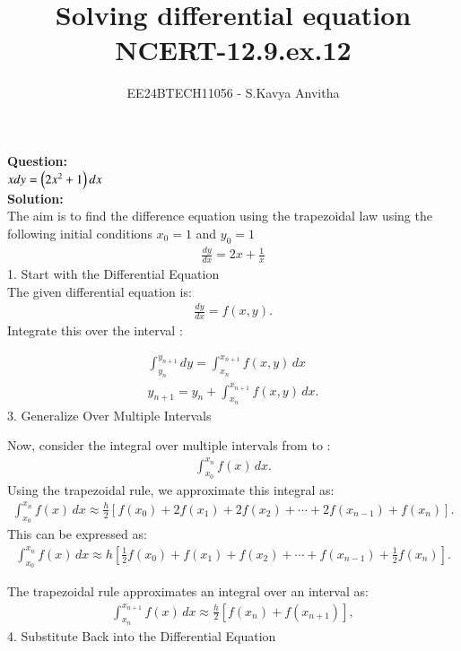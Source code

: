 \documentclass[journal]{IEEEtran}
\begin{document}

\vspace{3cm}

\title{Solving differential equation\\NCERT-12.9.ex.12}
\author{EE24BTECH11056 - S.Kavya Anvitha}
\maketitle
\bigskip

\renewcommand{\thefigure}{\theenumi}
\renewcommand{\thetable}{\theenumi}
\textbf{Question:}\\
$xdy = \left(2x^2+1\right)dx$\\
\textbf{Solution:}\\
The aim is to find the difference equation using the trapezoidal law using the following  initial conditions $x_0 = 1$ and $y_0 = 1$
\begin{align}
  \frac{dy}{dx} = 2x + \frac{1}{x}
\end{align}
1. Start with the Differential Equation\\
The given differential equation is:
\begin{align}
    \frac{dy}{dx} = f(x, y).
\end{align}
Integrate this over the interval :

\begin{align}
\int_{y_n}^{y_{n+1}} dy = \int_{x_n}^{x_{n+1}} f(x, y) \, dx\\
y_{n+1} = y_n + \int_{x_n}^{x_{n+1}} f(x, y) \, dx.
\end{align}
3. Generalize Over Multiple Intervals

Now, consider the integral over multiple intervals from  to :
\begin{align}
\int_{x_0}^{x_n} f(x) \, dx.
\end{align}
Using the trapezoidal rule, we approximate this integral as:
\begin{align}
\int_{x_0}^{x_n} f(x) \, dx \approx \frac{h}{2} \left[ f(x_0) + 2f(x_1) + 2f(x_2) + \cdots + 2f(x_{n-1}) + f(x_n) \right].
\end{align}
This can be expressed as:
\begin{align}
\int_{x_0}^{x_n} f(x) \, dx \approx h \left[ \frac{1}{2} f(x_0) + f(x_1) + f(x_2) + \cdots + f(x_{n-1}) + \frac{1}{2} f(x_n) \right].
\end{align}

The trapezoidal rule approximates an integral over an interval  as:
\begin{align}
\int_{x_n}^{x_{n+1}} f(x) \, dx \approx \frac{h}{2} \left[ f(x_n) + f(x_{n+1}) \right],
\end{align}
4. Substitute Back into the Differential Equation
\end{document}
